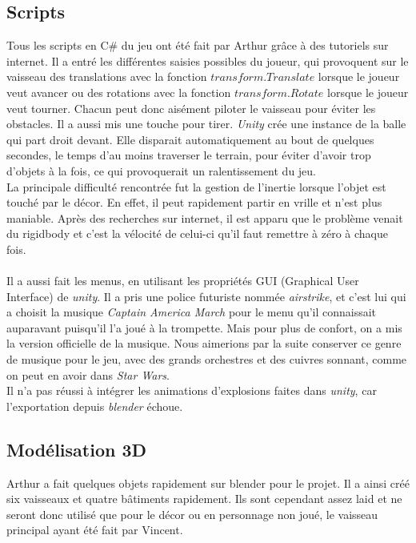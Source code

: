 \documentclass[10pt, titlepage]{report}
\begin{document}
\subsection{Scripts}
Tous les scripts en C\# du jeu ont été fait par Arthur grâce à des tutoriels sur internet. Il a entré les différentes saisies possibles du joueur, qui provoquent sur le vaisseau des translations avec la fonction $transform.Translate$ lorsque le joueur veut avancer ou des rotations avec la fonction $transform.Rotate$ lorsque le joueur veut tourner. Chacun peut donc aisément piloter le vaisseau pour éviter les obstacles. Il a aussi mis une touche pour tirer. \textit{Unity} crée une instance de la balle qui part droit devant. Elle disparait automatiquement au bout de quelques secondes, le temps d'au moins traverser le terrain, pour éviter d'avoir trop d'objets à la fois, ce qui provoquerait un ralentissement du jeu. \\

La principale difficulté rencontrée fut la gestion de l'inertie lorsque l'objet est touché par le décor. En effet, il peut rapidement partir en vrille et n'est plus maniable. Après des recherches sur internet, il est apparu que le problème venait du rigidbody et c'est la vélocité de celui-ci qu'il faut remettre à zéro à chaque fois.\\ \\

 Il a aussi fait les menus, en utilisant les propriétés GUI (Graphical User Interface) de \textit{unity}. Il a pris une police futuriste nommée \textit{airstrike}, et c'est lui qui a choisit la musique \textit{Captain America March} pour le menu qu'il connaissait auparavant puisqu'il l'a joué à la trompette. Mais pour plus de confort, on a mis la version officielle de la musique. Nous aimerions par la suite conserver ce genre de musique pour le jeu, avec des grands orchestres et des cuivres sonnant, comme on peut en avoir dans \textit{Star Wars}.\\

Il n'a pas réussi à intégrer les animations d'explosions faites dans \textit{unity}, car l'exportation depuis \textit{blender} échoue.

\subsection{Modélisation 3D}
Arthur a fait quelques objets rapidement sur blender pour le projet. Il a ainsi créé six vaisseaux et quatre bâtiments rapidement. Ils sont cependant assez laid et ne seront donc utilisé que pour le décor ou en personnage non joué, le vaisseau principal ayant été fait par Vincent.
\end{document}

